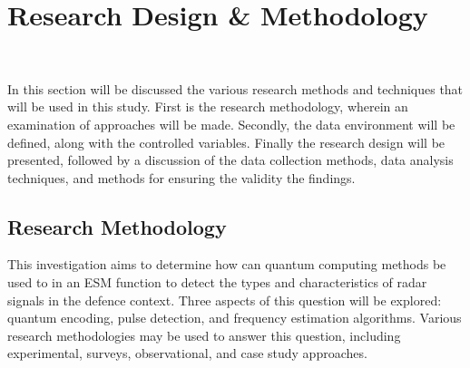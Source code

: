


\section{Research Design \& Methodology}~\label{sec:design}

In this section will be discussed the various research methods and techniques that will be used in this study.
First is the research methodology, wherein an examination of approaches will be made.
Secondly, the data environment will be defined, along with the controlled variables.
Finally the research design will be presented, followed by a discussion of the data collection methods, data analysis techniques, and methods for ensuring the validity the findings.


\subsection{Research Methodology}
This investigation aims to determine how can quantum computing methods be used to in an \ac{ESM} function to detect the types and characteristics of radar signals in the defence context.
Three aspects of this question will be explored: quantum encoding, pulse detection, and frequency estimation algorithms.
Various research methodologies may be used to answer this question, including experimental, surveys, observational, and case study approaches.

